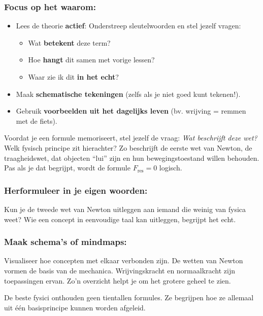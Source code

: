 \documentclass{ximera}
\begin{document}
\subsubsection{Focus op het waarom:}  
\begin{itemize}
    \item Lees de theorie \textbf{actief}: Onderstreep sleutelwoorden en stel jezelf vragen:
    \begin{itemize}
        \item Wat \textbf{betekent} deze term?
        \item Hoe \textbf{hangt} dit samen met vorige lessen?
        \item Waar zie ik dit \textbf{in het echt}?
    \end{itemize}
    \item Maak \textbf{schematische tekeningen} (zelfs als je niet goed kunt tekenen!).
    \item Gebruik \textbf{voorbeelden uit het dagelijks leven} (bv. wrijving = remmen met de fiets).
\end{itemize}
Voordat je een formule memoriseert, stel jezelf de vraag: \textit{Wat beschrijft deze wet?}  
Welk fysisch principe zit hierachter?  
Zo beschrijft de eerste wet van Newton, de traagheidswet, dat objecten “lui” zijn en hun bewegingstoestand willen behouden.  
Pas als je dat begrijpt, wordt de formule $F_{\text{res}} = 0$ logisch.


\subsubsection*{Herformuleer in je eigen woorden:}
Kun je de tweede wet van Newton uitleggen aan iemand die weinig van fysica weet?  
Wie een concept in eenvoudige taal kan uitleggen, begrijpt het echt.

\subsubsection*{Maak schema’s of mindmaps:}
Visualiseer hoe concepten met elkaar verbonden zijn.  
De wetten van Newton vormen de basis van de mechanica. Wrijvingskracht en normaalkracht zijn toepassingen ervan.  
Zo’n overzicht helpt je om het grotere geheel te zien.

\begin{remark}
De beste fysici onthouden geen tientallen formules. Ze begrijpen hoe ze allemaal uit één basisprincipe kunnen worden afgeleid.
\end{remark}
\end{document}
